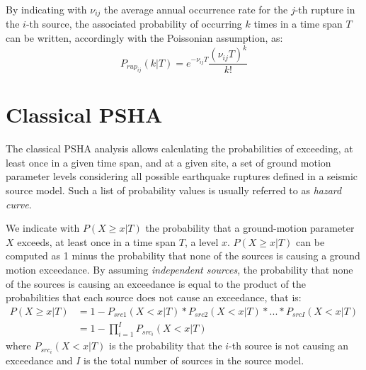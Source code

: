 By indicating with $\nu_{ij}$ the average annual occurrence rate for the $j$-th rupture in the $i$-th source, the
associated probability of occurring $k$ times in a time span $T$ can be written, accordingly with the Poissonian assumption,
as:
\begin{equation}
\label{eq:poisson_pd}
P_{rup_{ij}}(k | T) = e^{-\nu_{ij} T} \frac{(\nu_{ij} T) ^ {k}}{k!}
\end{equation}

\section{Classical PSHA}
The classical PSHA analysis allows calculating the probabilities of exceeding, at least once in a given time
span, and at a given site, a set of ground motion parameter levels considering all possible earthquake ruptures
defined in a seismic source model. Such a list of probability values is usually referred to as \textit{hazard curve}.

We indicate with $P(X \ge x | T)$ the probability that a ground-motion parameter $X$ exceeds, at least once in
a time span $T$, a level $x$. $P(X \ge x | T)$ can be computed as 1 minus the probability that none of the
sources is causing a ground motion exceedance. By assuming \textit{independent sources}, the probability
that none of the sources is causing an exceedance is equal to the product of the probabilities that each source
does not cause an exceedance, that is:
\begin{align}
\label{eq:hazard_eq}
P(X \ge x | T) & =  1 - P_{src1}(X < x | T) * P_{src2}(X < x | T) * ... * P_{srcI}(X < x | T) \nonumber \\
		      & =  1 - \prod_{i=1}^{I} P_{src_{i}}(X < x | T)
\end{align}
where $P_{src_{i}}(X < x | T)$ is the probability that the $i$-th source is not causing an exceedance and $I$ is the
total number of sources in the source model.


